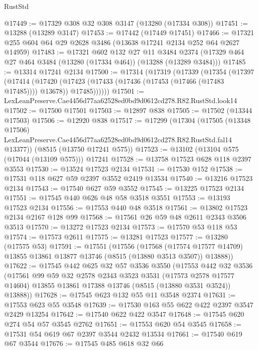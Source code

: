 \begin{lexlean}{RustStd}
\begin{coremodule}
@17449 := @17329 @308 @32 @308 @3147 (@13280 (@17334 @308))
@17451 := @13288 (@13289 @3147)
@17453 := @17442 (@17449 @17451)
@17466 := @17321 @255 @604 @64 @29 @2628 @3486 (@13638 @17241 @2134 @252 @64 @2627 @14959)
@17483 := @17321
    @602
    @132
    @27
    @11
    @3484
    @2374
    (@17329 @464 @27 @464 @3484 (@13280 (@17334 @464)) (@13288 (@13289 @3484)))
@17485 := @13314 @17241 @2134
@17500 := @17314
    (@17319
      (@17339
        (@17354
          (@17397
            (@17414
              (@17420
                (@17423 (@17433 (@17436 (@17453 (@17466 (@17483 @17485)))) @13678))
                @17485))))))
@17501 := LexLeanPreserve.Cae4456d77aa62528ed0bd9d0612cd278.R82.RustStd.look14
@17502 := @17500 @17501
@17503 := @12897 @838
@17505 := @17502 (@13344 @17503)
@17506 := @12920 @838
@17517 := @17299
    (@17304
      (@17505
        (@13348 @17506)
        LexLeanPreserve.Cae4456d77aa62528ed0bd9d0612cd278.R82.RustStd.fal14
        @13377))
    (@8515 (@13750 @17241 @575))
@17523 := @13102 (@13104 @575 (@17044 (@13109 @575))) @17241
@17528 := @13758 @17523 @628 @118 @2397 @3553
@17530 := @13524 @17523 @2134
@17531 := @17530 @152
@17538 := @17531 @118 @627 @59 @2397 @3552 @2419 @13534
@17540 := @13216 @17523 @2134
@17543 := @17540 @627 @59 @3552
@17545 := @13225 @17523 @2134
@17551 := @17545 @440 @626 @48 @58 @3518 @3551
@17553 := @13193 @17523 @2134
@17556 := @17553 @440 @48 @3518
@17561 := @13802 @17523 @2134 @2167 @128 @99
@17568 := @17561 @26 @59 @48 @2611 @2343 @3506 @3513
@17570 := @13272 @17523 @2134
@17573 := @17570 @53 @118 @53
@17574 := @17573 @2611
@17575 := @13281 @17523
@17577 := @13280 (@17575 @53)
@17591 := @17551
    (@17556
      (@17568
        (@17574 @17577 @14709)
        @13855
        @13861
        @13877
        @13746
        (@8515 (@13880 @3513 @3507))
        @13888))
@17622 := @17545
    @442
    @625
    @32
    @57
    @3536
    @3550
    (@17553
      @442
      @32
      @3536
      (@17561
        @99
        @59
        @32
        @2578
        @2343
        @3523
        @3531
        (@17573 @2578 @17577 @14604)
        @13855
        @13861
        @17388
        @13746
        (@8515 (@13880 @3531 @3524))
        @13888))
@17628 := @17545 @623 @132 @55 @11 @3548 @2374
@17631 := @17553 @623 @55 @3548
@17639 := @17530 @163 @55 @622 @422 @2397 @3547 @2429 @13254
@17642 := @17540 @622 @422 @3547
@17648 := @17545 @620 @274 @54 @57 @3545 @2762
@17651 := @17553 @620 @54 @3545
@17658 := @17531 @54 @619 @67 @2397 @3544 @2432 @13534
@17661 := @17540 @619 @67 @3544
@17676 := @17545
    @485
    @618
    @32
    @66

\end{coremodule}
\end{lexlean}
